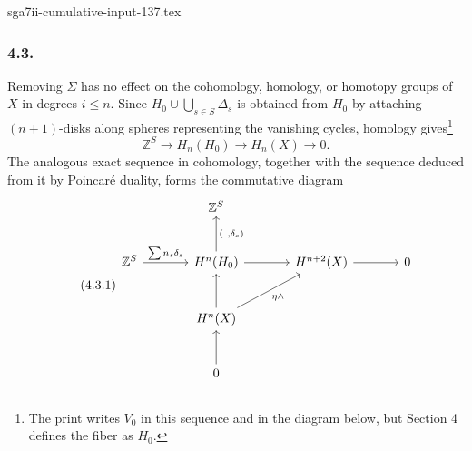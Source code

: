 \begin{filecontents*}{sga7ii-cumulative-input-137.tex}
\subsubsection*{4.3.}
Removing $\Sigma$ has no effect on the cohomology, homology, or homotopy
groups of $X$ in degrees $i\leq n$.  Since
$H_0\cup\bigcup_{s\in S}\Delta_s$ is obtained from $H_0$ by attaching
$(n+1)$-disks along spheres representing the vanishing cycles, homology
gives\footnote{The print writes $V_0$ in this sequence and in the diagram
below, but Section 4 defines the fiber as $H_0$.}
\[
 \mathbb Z^S\longrightarrow H_n(H_0)\longrightarrow H_n(X)
 \longrightarrow0.
\]
The analogous exact sequence in cohomology, together with the sequence
deduced from it by Poincar\'e duality, forms the commutative diagram
\begin{equation}\tag{4.3.1}
\begin{tikzcd}[row sep=large,column sep=large]
{} & \mathbb Z^S & {} & {} \\
\mathbb Z^S \arrow[r,"{\sum n_s\delta_s}"] &
H^n(H_0) \arrow[u,"{(\ ,\delta_s)}"'] \arrow[r] &
H^{n+2}(X) \arrow[r] & 0 \\
{} & H^n(X) \arrow[u] \arrow[ur,"{\eta\wedge}"'] & {} & {} \\
{} & 0 \arrow[u] & {} & {}
\end{tikzcd}
\end{equation}
\end{filecontents*}
